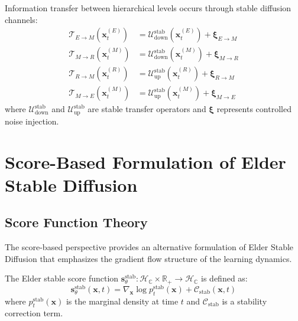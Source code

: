 \begin{definition}
Information transfer between hierarchical levels occurs through stable diffusion channels:
\begin{align}
\mathcal{T}_{E \to M}(\mathbf{x}_t^{(E)}) &= \mathcal{U}_{\text{down}}^{\text{stab}}(\mathbf{x}_t^{(E)}) + \boldsymbol{\xi}_{E \to M} \\
\mathcal{T}_{M \to R}(\mathbf{x}_t^{(M)}) &= \mathcal{U}_{\text{down}}^{\text{stab}}(\mathbf{x}_t^{(M)}) + \boldsymbol{\xi}_{M \to R} \\
\mathcal{T}_{R \to M}(\mathbf{x}_t^{(R)}) &= \mathcal{U}_{\text{up}}^{\text{stab}}(\mathbf{x}_t^{(R)}) + \boldsymbol{\xi}_{R \to M} \\
\mathcal{T}_{M \to E}(\mathbf{x}_t^{(M)}) &= \mathcal{U}_{\text{up}}^{\text{stab}}(\mathbf{x}_t^{(M)}) + \boldsymbol{\xi}_{M \to E}
\end{align}
where $\mathcal{U}_{\text{down}}^{\text{stab}}$ and $\mathcal{U}_{\text{up}}^{\text{stab}}$ are stable transfer operators and $\boldsymbol{\xi}$ represents controlled noise injection.
\end{definition}

\section{Score-Based Formulation of Elder Stable Diffusion}

\subsection{Score Function Theory}

The score-based perspective provides an alternative formulation of Elder Stable Diffusion that emphasizes the gradient flow structure of the learning dynamics.

\begin{definition}
The Elder stable score function $\mathbf{s}_\theta^{\text{stab}}: \mathcal{H}_{\mathbb{C}} \times \mathbb{R}_+ \to \mathcal{H}_{\mathbb{C}}$ is defined as:
\begin{equation}
\mathbf{s}_\theta^{\text{stab}}(\mathbf{x}, t) = \nabla_{\mathbf{x}} \log p_t^{\text{stab}}(\mathbf{x}) + \mathcal{C}_{\text{stab}}(\mathbf{x}, t)
\end{equation}
where $p_t^{\text{stab}}(\mathbf{x})$ is the marginal density at time $t$ and $\mathcal{C}_{\text{stab}}$ is a stability correction term.
\end{definition}

